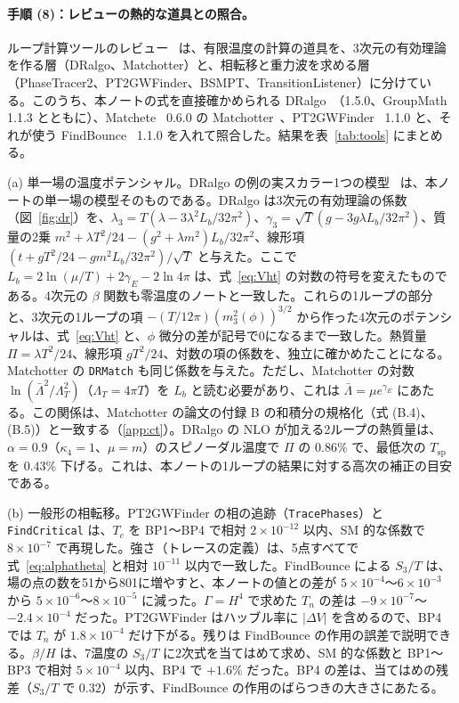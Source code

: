 \documentclass[a4paper,10pt]{ltjsarticle}
\begin{document}
\paragraph{手順 (8)：レビューの熱的な道具との照合。}ループ計算ツールのレビュー~\cite{toolsreview} は、有限温度の計算の道具を、3次元の有効理論を作る層（DRalgo、Matchotter）と、相転移と重力波を求める層（PhaseTracer2、PT2GWFinder、BSMPT、TransitionListener）に分けている。このうち、本ノートの式を直接確かめられる DRalgo~\cite{dralgo}（1.5.0、GroupMath~\cite{groupmath} 1.1.3 とともに）、Matchete~\cite{matchete} 0.6.0 の Matchotter~\cite{matchotter}、PT2GWFinder~\cite{pt2gw} 1.1.0 と、それが使う FindBounce~\cite{findbounce} 1.1.0 を入れて照合した。結果を表~\ref{tab:tools} にまとめる。

(a) 単一場の温度ポテンシャル。DRalgo の例の実スカラー1つの模型~\cite{gould21} は、本ノートの単一場の模型そのものである。DRalgo は3次元の有効理論の係数（図~\ref{fig:dr}）を、$\lambda_3=T(\lambda-3\lambda^2L_b/32\pi^2)$、$\gamma_3=\sqrt T(g-3g\lambda L_b/32\pi^2)$、質量の2乗 $m^2+\lambda T^2/24-(g^2+\lambda m^2)L_b/32\pi^2$、線形項 $(t+gT^2/24-gm^2L_b/32\pi^2)/\sqrt T$ と与えた。ここで $L_b=2\ln(\mu/T)+2\gamma_E-2\ln4\pi$ は、式~\eqref{eq:Vht} の対数の符号を変えたものである。4次元の $\beta$ 関数も零温度のノートと一致した。これらの1ループの部分と、3次元の1ループの項 $-(T/12\pi)(m_3^2(\phi))^{3/2}$ から作った4次元のポテンシャルは、式~\eqref{eq:Vht} と、$\phi$ 微分の差が記号で0になるまで一致した。熱質量 $\Pi=\lambda T^2/24$、線形項 $gT^2/24$、対数の項の係数を、独立に確かめたことになる。Matchotter の \texttt{DRMatch} も同じ係数を与えた。ただし、Matchotter の対数 $\ln(\bar\Lambda^2/\Lambda_T^2)$（$\Lambda_T=4\pi T$）を $L_b$ と読む必要があり、これは $\bar\Lambda=\mu e^{\gamma_E}$ にあたる。この関係は、Matchotter の論文の付録 B の和積分の規格化（式 (B.4)、(B.5)）と一致する（\ref{app:ct}）。DRalgo の NLO が加える2ループの熱質量は、$\alpha=0.9$（$\kappa_4=1$、$\mu=m$）のスピノーダル温度で $\Pi$ の $0.86\%$ で、最低次の $T_{\mathrm{sp}}$ を $0.43\%$ 下げる。これは、本ノートの1ループの結果に対する高次の補正の目安である。

(b) 一般形の相転移。PT2GWFinder の相の追跡（\texttt{TracePhases}）と \texttt{FindCritical} は、$T_c$ を BP1〜BP4 で相対 $2\times10^{-12}$ 以内、SM 的な係数で $8\times10^{-7}$ で再現した。強さ（トレースの定義）は、5点すべてで式~\eqref{eq:alphatheta} と相対 $10^{-11}$ 以内で一致した。FindBounce による $S_3/T$ は、場の点の数を51から801に増やすと、本ノートの値との差が $5\times10^{-4}$〜$6\times10^{-3}$ から $5\times10^{-6}$〜$8\times10^{-5}$ に減った。$\Gamma=H^4$ で求めた $T_n$ の差は $-9\times10^{-7}$〜$-2.4\times10^{-4}$ だった。PT2GWFinder はハッブル率に $|\Delta V|$ を含めるので、BP4 では $T_n$ が $1.8\times10^{-4}$ だけ下がる。残りは FindBounce の作用の誤差で説明できる。$\beta/H$ は、7温度の $S_3/T$ に2次式を当てはめて求め、SM 的な係数と BP1〜BP3 で相対 $5\times10^{-4}$ 以内、BP4 で $+1.6\%$ だった。BP4 の差は、当てはめの残差（$S_3/T$ で $0.32$）が示す、FindBounce の作用のばらつきの大きさにあたる。
\end{document}

